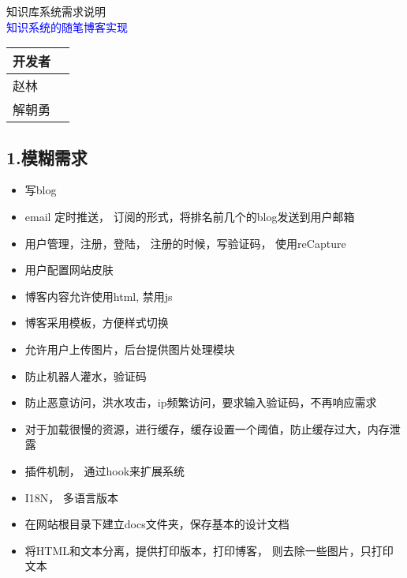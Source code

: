 \documentclass[a4paper,oneside,12pt]{book}
\newenvironment{SChinese}{
  \CJKfamily{gkai}
  \CJKtilde
  \CJKnospace}{}
\begin{document}
\begin{CJK*}{UTF8}{kai}
\begin{SChinese}
\begin{center}
\huge{知识库系统需求说明}\\
 \textcolor{blue}{\Large{知识系统的随笔博客实现}\\}
 \normalsize{}
\vspace{1cm} 
\begin{tabular}{|l|l|}
\hline
开发者\\
\hline
赵林\\
\hline
解朝勇\\
\hline
\end{tabular}
\end{center}
\begin{flushleft}
\section*{1.模糊需求}
\begin{itemize}
\item{写blog}
\item{email 定时推送， 订阅的形式，将排名前几个的blog发送到用户邮箱}
\item{用户管理，注册，登陆， 注册的时候，写验证码， 使用reCapture}
\item{用户配置网站皮肤}
\item{博客内容允许使用html, 禁用js}
\item{博客采用模板，方便样式切换}
\item{允许用户上传图片，后台提供图片处理模块}
\item{防止机器人灌水，验证码}
\item{防止恶意访问，洪水攻击，ip频繁访问，要求输入验证码，不再响应需求}
\item{对于加载很慢的资源，进行缓存，缓存设置一个阈值，防止缓存过大，内存泄露}
\item{插件机制， 通过hook来扩展系统}
\item{I18N， 多语言版本}
\item{在网站根目录下建立docs文件夹，保存基本的设计文档}
\item{将HTML和文本分离，提供打印版本，打印博客， 则去除一些图片，只打印文本}
\end{itemize}
\end{flushleft}
\end{SChinese}
\end{CJK*}
\end{document}
